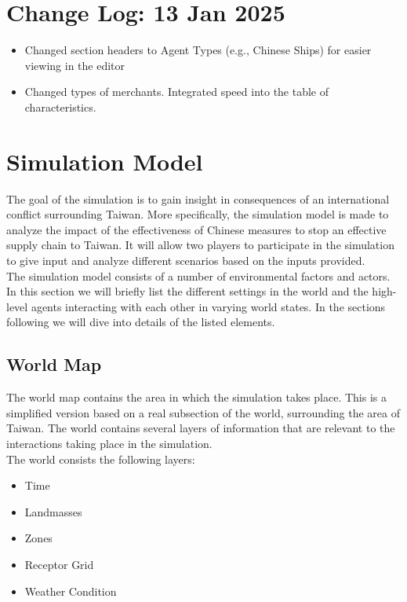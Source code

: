 \documentclass{article}
\begin{document}
\tableofcontents

\section{Change Log: 13 Jan 2025}

\begin{itemize}
    \item Changed section headers to Agent Types (e.g., Chinese Ships) for easier viewing in the editor
    \item Changed types of merchants. Integrated speed into the table of characteristics.
\end{itemize}

\section{Simulation Model}
The goal of the simulation is to gain insight in consequences of an international conflict surrounding Taiwan. More specifically, the simulation model is made to analyze the impact of the effectiveness of Chinese measures to stop an effective supply chain to Taiwan. It will allow two players to participate in the simulation to give input and analyze different scenarios based on the inputs provided. \\

\noindent The simulation model consists of a number of environmental factors and actors. In this section we will briefly list the different settings in the world and the high-level agents interacting with each other in varying world states. In the sections following we will dive into details of the listed elements.

\subsection{World Map}
The world map contains the area in which the simulation takes place. This is a simplified version based on a real subsection of the world, surrounding the area of Taiwan. The world contains several layers of information that are relevant to the interactions taking place in the simulation. \\

\noindent The world consists the following layers:

    \begin{itemize}
        \item Time
        \item Landmasses
        \item Zones
        \item Receptor Grid
        \item Weather Condition
    \end{itemize}
\end{document}
